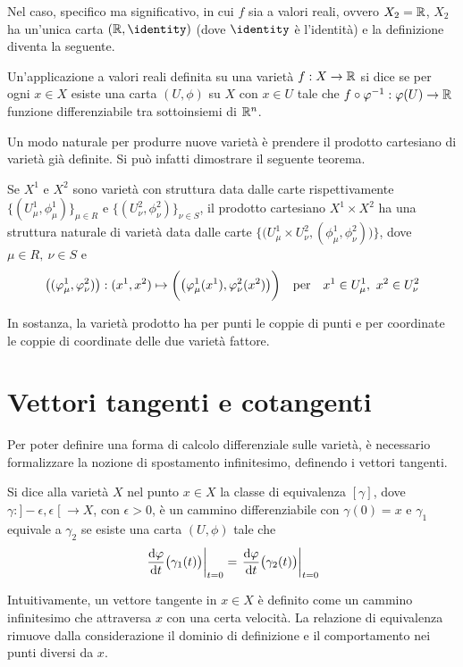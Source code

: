Nel caso, specifico ma significativo, in cui $f$ sia a valori reali, ovvero $X_2 = \mathbb{R}$, $X_2$ ha un'unica carta $(\R, \identity)$ (dove $\identity$ è l'identità) e la definizione diventa la seguente.
\begin{definition}
  Un'applicazione a valori reali definita su una varietà $f:X\to \mathbb{R}$ si dice  se per ogni $x \in X$ esiste una carta $(U, \phi)$ su $X$ con $x \in  U$ tale che $f\circ \varphi^{-1}: \varphi(U) \to \mathbb{R}$ funzione differenziabile tra sottoinsiemi di $\mathbb{R}^{n}$.
\end{definition}

Un modo naturale per produrre nuove varietà è prendere il prodotto cartesiano di varietà già definite. Si può infatti dimostrare il seguente teorema.
\begin{theorem}
  Se $X^1$ e $X^2$ sono varietà con struttura data dalle carte rispettivamente $\big\lbrace(U^1_{\mu}, \phi^1_{\mu})\big\rbrace_{\mu \in R}$ e $\big\lbrace (U^2_{\nu}, \phi^2_{\nu})\big\rbrace_{\nu \in S}$, il prodotto cartesiano $X^1 \times X^2$ ha una struttura naturale di varietà data dalle carte $\Big\lbrace\big( U^1_{\mu} \times U^2_{\nu}, (\phi^1_{\mu},\phi^2_{\nu})\big)\Big\rbrace$, dove $\mu \in  R,\ \nu \in S$ e \begin{equation*}
    \big((\phi^1_{\mu},\phi^2_{\nu})\big): (x^1,x^2) \mapsto \bigg(\big(\phi^1_{\mu}(x^1),\phi^2_{\nu}(x^2)\big)\bigg) \qqtext{per} x^1 \in U^1_{\mu},\ x^2 \in  U^2_{\nu}
  \end{equation*} 
\end{theorem}
\begin{remark}
  In sostanza, la varietà prodotto ha per punti le coppie di punti e per coordinate le coppie di coordinate delle due varietà fattore.
\end{remark}

\section{Vettori tangenti e cotangenti}
Per poter definire una forma di calcolo differenziale sulle varietà, è necessario formalizzare la nozione di spostamento infinitesimo, definendo i vettori tangenti.

\begin{definition}
  Si dice  alla varietà $X$ nel punto $x \in  X$ la classe di equivalenza $[\gamma]$, dove $\gamma:]-\epsilon,\epsilon\;[\ \to X$, con $\epsilon > 0$, è un cammino differenziabile con $\gamma(0) = x$ e $\gamma_1$ equivale a $\gamma_2$ se esiste una carta $(U, \phi)$ tale che \begin{equation*}
  \eval{\dv{\phi}{t}\big(\gamma_1(t)\big)}_{t=0} = \eval{\dv{\phi}{t}\big(\gamma_2(t)\big)}_{t=0}
  \end{equation*} 
\end{definition}
\begin{remark}
  Intuitivamente, un vettore tangente in $x \in X$ è definito come un cammino infinitesimo che attraversa $x$ con una certa velocità. La relazione di equivalenza rimuove dalla considerazione il dominio di definizione e il comportamento nei punti diversi da $x$.
\end{remark}

